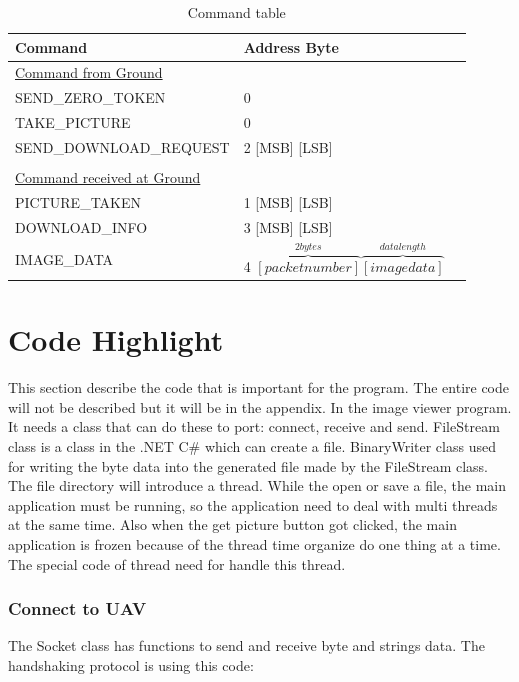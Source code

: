\begin{table}[H]

\begin{center}
\begin{tabular}{l l @{.} l}
 Command&
\multicolumn{2}{l}{Address Byte } \\

\hline
\underline{Command from Ground} & \\
SEND\_ZERO\_TOKEN & 0 \\
TAKE\_PICTURE & 0 \\
SEND\_DOWNLOAD\_REQUEST & 2 [MSB] [LSB]  \\
\\
\underline{Command received at Ground}\\
PICTURE\_TAKEN & 1 [MSB] [LSB]\\
DOWNLOAD\_INFO & 3 [MSB] [LSB]\\
IMAGE\_DATA & 4 $\overbrace{ [packet number]}^{2bytes} \overbrace{[image data]}^{data length}$ \\
\end{tabular}
\caption{Command table\label{command_table}}
\end{center}
\end{table}
 
 
\section{Code Highlight}

This section describe the code that is important for the program. The entire code will not be described but it will be in the appendix. In the image viewer program. It needs a class that can do these to port: connect, receive and send. FileStream class is a class in the .NET C\# which can create a file. BinaryWriter class used for writing the byte data into the generated file made by the FileStream class. The file directory will introduce a thread. While the open or save a file, the main application must be running, so the application need to deal with multi threads at the same time. Also when the get picture button got clicked, the main application is frozen because of the thread time organize do one thing at a time. The special code of thread need for handle this thread. 

\subsubsection*{Connect to UAV}
The Socket class has functions to send and receive byte and strings data. The handshaking protocol is using this code:

